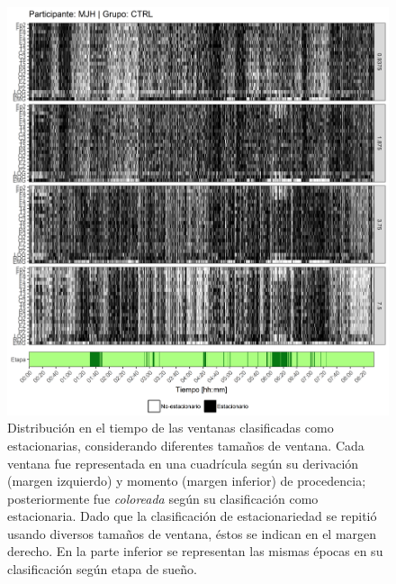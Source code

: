 \begin{figure}
\centering
\includegraphics[width=\linewidth]
{./scripts_graf_res/MJH_patrones_1.png}
\caption[Distribución en el tiempo de las ventanas clasificadas como estacionarias, considerando diferentes tamaños de ventana]{Distribución en el tiempo de las ventanas clasificadas como estacionarias, considerando diferentes tamaños de ventana. 
Cada ventana fue representada en una cuadrícula según su derivación (margen izquierdo) y momento (margen inferior) de procedencia; posteriormente fue \textit{coloreada} según su clasificación como estacionaria.
Dado que la clasificación de estacionariedad se repitió usando diversos tamaños de ventana, éstos se indican en el margen derecho.
En la parte inferior se representan las mismas épocas en su clasificación según etapa de sueño.}
\end{figure}
